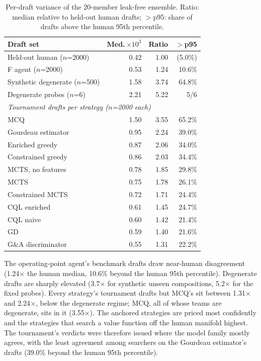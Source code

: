 \documentclass[journal]{IEEEtran}
\begin{document}
\begin{table}[t]
\centering
\caption{Per-draft variance of the 20-member leak-free ensemble. Ratio: median relative to held-out human drafts; $>$p95: share of drafts above the human 95th percentile.}
\label{tab:ensvar}
\small
\setlength{\tabcolsep}{4pt}
\begin{tabular}{lrrr}
\toprule
Draft set & Med.\,$\times10^{3}$ & Ratio & $>$p95 \\
\midrule
Held-out human ($n$=2000) & 0.42 & 1.00 & (5.0\%) \\
F agent ($n$=2000) & 0.53 & 1.24 & 10.6\% \\
Synthetic degenerate ($n$=500) & 1.58 & 3.74 & 64.8\% \\
Degenerate probes ($n$=6) & 2.21 & 5.22 & 5/6 \\
\midrule
\multicolumn{4}{l}{\textit{Tournament drafts per strategy ($n$=2000 each)}}\\
MCQ & 1.50 & 3.55 & 65.2\% \\
Gourdeau estimator & 0.95 & 2.24 & 39.0\% \\
Enriched greedy & 0.87 & 2.06 & 34.0\% \\
Constrained greedy & 0.86 & 2.03 & 34.4\% \\
MCTS, no features & 0.78 & 1.85 & 29.8\% \\
MCTS & 0.75 & 1.78 & 26.1\% \\
Constrained MCTS & 0.72 & 1.71 & 24.4\% \\
CQL enriched & 0.61 & 1.45 & 24.7\% \\
CQL naive & 0.60 & 1.42 & 21.4\% \\
GD & 0.59 & 1.40 & 21.6\% \\
G\&A discriminator & 0.55 & 1.31 & 22.2\% \\
\bottomrule
\end{tabular}
\end{table}

The operating-point agent's benchmark drafts draw near-human disagreement (1.24$\times$ the human median, 10.6\% beyond the human 95th percentile). Degenerate drafts are sharply elevated (3.7$\times$ for synthetic unseen compositions, 5.2$\times$ for the fixed probes). Every strategy's tournament drafts but MCQ's sit between 1.31$\times$ and 2.24$\times$, below the degenerate regime; MCQ, all of whose teams are degenerate, sits in it (3.55$\times$). The anchored strategies are priced most confidently and the strategies that search a value function off the human manifold highest. The tournament's verdicts were therefore issued where the model family mostly agrees, with the least agreement among searchers on the Gourdeau estimator's drafts (39.0\% beyond the human 95th percentile).
\end{document}
